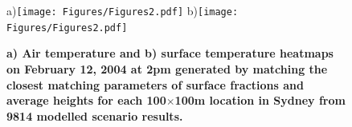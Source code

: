 \documentclass[final,3p,times,authoryear]{elsarticle}
\begin{document}
\begin{figure}
\centering
a)\texttt{[image: Figures/Figures2.pdf]}
b)\texttt{[image: Figures/Figures2.pdf]}
\caption{\bf a) Air temperature and b) surface temperature heatmaps on February 12, 2004 at 2pm generated by matching the closest matching parameters of surface fractions and average heights for each 100$\times$100m location in Sydney from 9814 modelled scenario results.  }
 \label{fig:TaSyd}
\end{figure}








\end{document}
